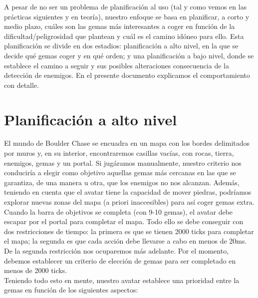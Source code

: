 A pesar de no ser un problema de planificación al uso (tal y como vemos en las prácticas siguientes y en teoría), nuestro enfoque se basa en planificar, a corto y medio plazo, cuáles son las gemas más interesantes a coger en función de la dificultad/peligrosidad que plantean y cuál es el camino idóneo para ello. Esta planificación se divide en dos estadios: planificación a alto nivel, en la que se decide qué gemas coger y en qué orden; y una planificación a bajo nivel, donde se establece el camino a seguir y sus posibles alteraciones consecuencia de la detección de enemigos. En el presente documento explicamos el comportamiento con detalle.

\section{Planificación a alto nivel}

El mundo de Boulder Chase se encuadra en un mapa con los bordes delimitados por muros y, en su interior, encontraremos casillas vacías, con rocas, tierra, enemigos, gemas y un portal. Si jugáramos manualmente, nuestro criterio nos conduciría a elegir como objetivo aquellas gemas más cercanas en las que se garantiza, de una manera u otra, que los enemigos no nos alcanzan. Además, teniendo en cuenta que el avatar tiene la capacidad de mover piedras, podríamos explorar nuevas zonas del mapa (a priori inaccesibles) para así coger gemas extra. Cuando la barra de objetivos se completa (con 9-10 gemas), el avatar debe escapar por el portal para completar el mapa. Todo ello se debe conseguir con dos restricciones de tiempo: la primera es que se tienen 2000 ticks para completar el mapa; la segunda es que cada acción debe llevarse a cabo en menos de 20ms. De la segunda restricción nos ocuparemos más adelante. Por el momento, debemos establecer un criterio de elección de gemas para ser completado en menos de 2000 ticks.  \\

Teniendo todo esto en mente, nuestro avatar establece una prioridad entre la gemas en función de los siguientes aspectos:

